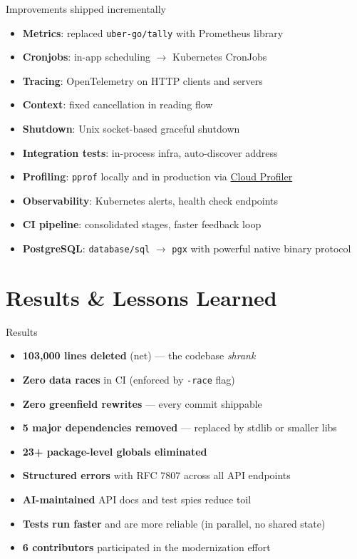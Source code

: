 \documentclass[aspectratio=169,11pt]{beamer}
\begin{document}
\begin{frame}{Improvements shipped incrementally}
  \begin{itemize}
    \setlength\itemsep{2pt}
    \item \textbf{Metrics}: replaced \texttt{uber-go/tally} with Prometheus library
    \item \textbf{Cronjobs}: in-app scheduling \(\rightarrow\) Kubernetes CronJobs
    \item \textbf{Tracing}: OpenTelemetry on HTTP clients and servers
    \item \textbf{Context}: fixed cancellation in reading flow
    \item \textbf{Shutdown}: Unix socket-based graceful shutdown
    \item \textbf{Integration tests}: in-process infra, auto-discover address
    \item \textbf{Profiling}: \texttt{pprof} locally and in production via \href{https://docs.cloud.google.com/profiler/docs/profiling-go}{Cloud Profiler}
    \item \textbf{Observability}: Kubernetes alerts, health check endpoints
    \item \textbf{CI pipeline}: consolidated stages, faster feedback loop
    \item \textbf{PostgreSQL}: \texttt{database/sql} \(\rightarrow\) \texttt{pgx} with powerful native binary protocol
  \end{itemize}
\end{frame}

\section{Results \& Lessons Learned}

\begin{frame}{Results}
  \begin{itemize}
    \setlength\itemsep{5pt}
    \item \textbf{103{,}000 lines deleted} (net) --- the codebase \emph{shrank}
    \item \textbf{Zero data races} in CI (enforced by \texttt{-race} flag)
    \item \textbf{Zero greenfield rewrites} --- every commit shippable
    \item \textbf{5 major dependencies removed} --- replaced by stdlib or smaller libs
    \item \textbf{23+ package-level globals eliminated}
    \item \textbf{Structured errors} with RFC 7807 across all API endpoints
    \item \textbf{AI-maintained} API docs and test spies reduce toil
    \item \textbf{Tests run faster} and are more reliable (in parallel, no shared state)
    \item \textbf{6 contributors} participated in the modernization effort
  \end{itemize}
\end{frame}
\end{document}
